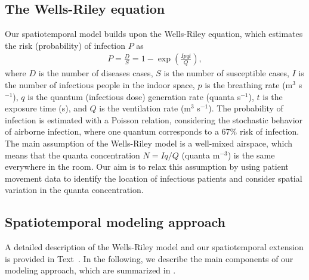 \documentclass[fleqn,11pt]{wlscirep}
\begin{document}
\subsection{The Wells-Riley equation}

Our spatiotemporal model builds upon the Wells-Riley equation\cite{Riley1978AJE}, which estimates the risk (probability) of infection $P$ as
\begin{align}
    P = \frac{D}{S} = 1 - \exp\left(\frac{Ipqt}{Q}\right),
\end{align}
where $D$ is the number of diseases cases, $S$ is the number of susceptible cases, $I$ is the number of infectious people in the indoor space, $p$ is the breathing rate (m$^3$ s$^{-1}$), $q$ is the quantum (infectious dose) generation rate (quanta s$^{-1}$), $t$ is the exposure time (s), and $Q$ is the ventilation rate (m$^3$ s$^{-1}$). The probability of infection is estimated with a Poisson relation, considering the stochastic behavior of airborne infection, where one quantum corresponds to a 67\% risk of infection. The main assumption of the Wells-Riley model is a well-mixed airspace, which means that the quanta concentration $N = Iq/Q$ (quanta m$^{-3}$) is the same everywhere in the room. Our aim is to relax this assumption by using patient movement data to identify the location of infectious patients and consider spatial variation in the quanta concentration. 

\subsection{Spatiotemporal modeling approach}

A detailed description of the Wells-Riley model and our spatiotemporal extension is provided in \supp Text~. In the following, we describe the main components of our modeling approach, which are summarized in .
\end{document}
